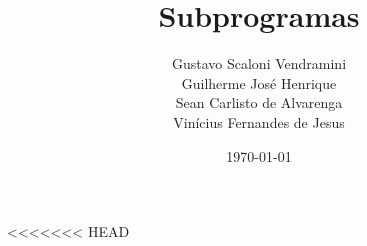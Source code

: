 \documentclass[a4paper]{article}
\title{Subprogramas}
\author{Gustavo Scaloni Vendramini    \\ 
        Guilherme José Henrique       \\
        Sean Carlisto de Alvarenga    \\
        Vinícius Fernandes de Jesus}
\date{\today}
\begin{document}
\maketitle
\pagebreak
\maketitle
\tableofcontents
<<<<<<< HEAD

\end{document}
